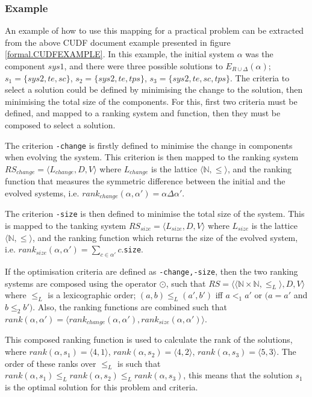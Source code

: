 \subsubsection{Example}
An example of how to use this mapping for a practical problem can be extracted from the above CUDF document example presented in figure \ref{formal.CUDFEXAMPLE}.
In this example, the initial system $\alpha$ was the component $sys1$, and there were three possible solutions to $E_{R \cup \Delta}(\alpha)$;
$s_1 = \{sys2, te, sc\}$,
$s_2 = \{sys2, te, tps\}$,
$s_3 = \{sys2, te, sc, tps\}$.
The criteria to select a solution could be defined by minimising the change to the solution, then minimising the total size of the components.
For this, first two criteria must be defined, and mapped to a ranking system and function, then they must be composed to select a solution.

The criterion \verb+-change+ is firstly defined to minimise the change in components when evolving the system.
This criterion is then mapped to the ranking system $RS_{change} = \langle L_{change},D,V \rangle$ where  $L_{change}$ is the lattice $\langle \mathbb{N}, \leq \rangle$,
and the ranking function that measures the symmetric difference between the initial and the evolved systems, i.e. $rank_{change}(\alpha,\alpha') = \alpha \Delta \alpha'$.

The criterion \verb+-size+ is then defined to minimise the total size of the system.
This is mapped to the tanking system $RS_{size} = \langle L_{size},D,V \rangle$ where  $L_{size}$ is the lattice  $\langle \mathbb{N}, \leq \rangle$,
and the ranking function which returns the size of the evolved system, i.e.  $rank_{size}(\alpha,\alpha') = \sum_{c \in \alpha'} c$.\verb+size+.

If the optimisation criteria are defined as \verb+-change,-size+, then the two ranking systems are composed using the operator $\odot$,
such that $RS = \langle \langle \mathbb{N} \times \mathbb{N}, \leq_L \rangle, D, V \rangle$ where $\leq_L$ is a lexicographic order;
$(a,b) \leq_{L} (a',b')$ iff $a <_{1} a'$ or $(a = a'$ and $b \leq_{2} b')$.
Also, the ranking functions are combined such that $rank(\alpha,\alpha') = \langle rank_{change}(\alpha,\alpha'), rank_{size}(\alpha,\alpha') \rangle$.

This composed ranking function is used to calculate the rank of the solutions, where $rank(\alpha,s_1) = \langle 4, 1\rangle$, $rank(\alpha,s_2) = \langle 4, 2\rangle$, $rank(\alpha,s_3) = \langle 5, 3\rangle$.
The order of these ranks over $\leq_L$ is such that $rank(\alpha,s_1) \leq_L rank(\alpha,s_2) \leq_L rank(\alpha,s_3)$,
this means that the solution $s_1$ is the optimal solution for this problem and criteria.  



